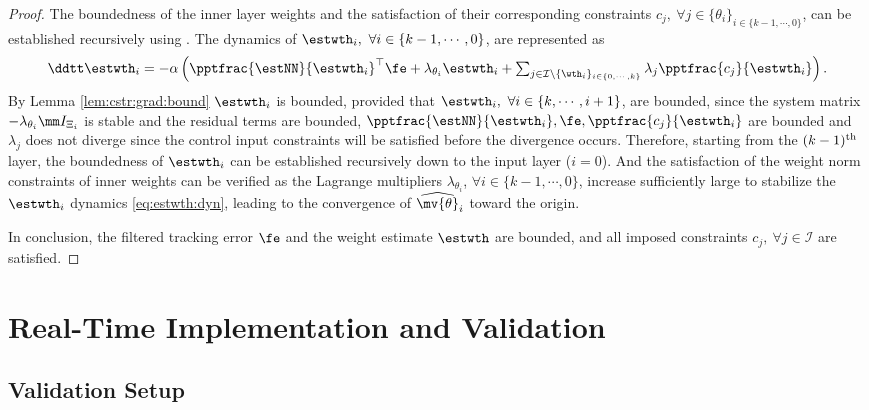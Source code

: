 \documentclass[journal]{IEEEtran}
\begin{document}
\begin{proof}
\hfill 

The boundedness of the inner layer weights and the satisfaction of their corresponding constraints $c_j,\ \forall j\in\{\theta_i\}_{i\in\{k-1,\cdots,0\}}$, can be established recursively using \cite[Chap.~4, Thm.~1.9]{Desoer:2009aa}.
The dynamics of $\estwth_i,\ \forall i\in\{k-1,\cdots,0\}$, are represented as
\begin{equation}
    \ddtt \estwth_i 
    =
    -\alpha
    \left(
        \pptfrac{\estNN}{\estwth_i}^\top
        \fe
        +
        \lambda_{\theta_i}\estwth_i
        +
        \textstyle\sum_{
            j\in\mathcal{I}\setminus \{\wth_i\}_{i\in\{0,\cdots,k\}}
        }
        \lambda_j
        \pptfrac{c_j}{\estwth_i}
    \right)
    .
    \label{eq:estwth:dyn}
\end{equation}
By Lemma \ref{lem:cstr:grad:bound} $\estwth_i$ is bounded, provided that $\estwth_i,\ \forall i\in\{k,\cdots,i+1\}$, are bounded, since the system matrix $-\lambda_{\theta_i} \mm I_{\Xi_i}$ is stable and the residual terms are bounded, \ie $\pptfrac{\estNN}{\estwth_i}, \fe, \pptfrac{c_j}{\estwth_i}$ are bounded and $\lambda_j$ does not diverge since the control input constraints will be satisfied before the divergence occurs.
Therefore, starting from the $(k-1)\textsuperscript{th}$ layer, the boundedness of $\estwth_i$ can be established recursively down to the input layer ($i=0$).
And the satisfaction of the weight norm constraints of inner weights can be verified as the Lagrange multipliers $\lambda_{\theta_i}$, $\forall i\in\{k-1,\cdots,0\}$, increase sufficiently large to stabilize the $\estwth_i$ dynamics \eqref{eq:estwth:dyn}, leading to the convergence of $\widehat{\mv{\theta}}_i$ toward the origin.

\hfill

In conclusion, the filtered tracking error $\fe$ and the weight estimate $\estwth$ are bounded, and all imposed constraints $c_j,\ \forall j\in\mathcal I$ are satisfied.

\end{proof}

\section{Real-Time Implementation and Validation}\label{sec:sim}

\subsection{Validation Setup}
\end{document}

